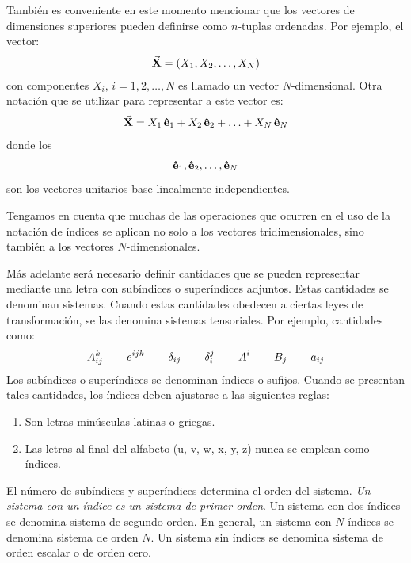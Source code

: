 \documentclass[hidelinks,12pt]{article}
\begin{document}
\par
También es conveniente en este momento mencionar que los vectores de dimensiones superiores pueden definirse como $n$-tuplas ordenadas. Por ejemplo, el vector:
\begin{align*}
\va{X} = (X_{1}, X_{2}, \ldots, X_{N})
\end{align*}
con componentes $X_{i}, \, i =1, 2, \ldots, N$ es llamado un vector $N$-dimensional. Otra notación que se utilizar para representar a este vector es:
\begin{align*}
\va{X} = X_{1} \, \vu{e}_{1} +  X_{2} \, \vu{e}_{2} +  \ldots +  X_{N} \, \vu{e}_{N}
\end{align*}
donde los
\begin{align*}
\vu{e}_{1}, \vu{e}_{2}, \ldots, \vu{e}_{N}
\end{align*}
son los vectores unitarios base linealmente independientes.
\par
Tengamos en cuenta que muchas de las operaciones que ocurren en el uso de la notación de índices se aplican no solo a los vectores tridimensionales, sino también a los vectores $N$-dimensionales.
\par
Más adelante será necesario definir cantidades que se pueden representar mediante una letra con subíndices o superíndices adjuntos. Estas cantidades se denominan sistemas. Cuando estas cantidades obedecen a ciertas leyes de transformación, se las denomina sistemas tensoriales. Por ejemplo, cantidades como:
\begin{align*}
A_{ij}^{k} \hspace{0.75cm} e^{ijk} \hspace{0.75cm} \delta_{ij} \hspace{0.75cm} \delta_{i}^{j} \hspace{0.75cm} A^{i} \hspace{0.75cm} B_{j} \hspace{0.75cm} a_{ij}
\end{align*}
Los subíndices o superíndices se denominan índices o sufijos. Cuando se presentan tales cantidades, los índices deben ajustarse a las siguientes reglas:
\begin{enumerate}
\item Son letras minúsculas latinas o griegas.
\item Las letras al final del alfabeto (u, v, w, x, y, z) nunca se emplean como índices.
\end{enumerate}
El número de subíndices y superíndices determina el orden del sistema. \emph{Un sistema con un índice es un sistema de primer orden}. Un sistema con dos índices se denomina sistema de segundo orden. En general, un sistema con $N$ índices se denomina sistema de orden $N$. Un sistema sin índices se denomina sistema de orden escalar o de orden cero.
\end{document}
